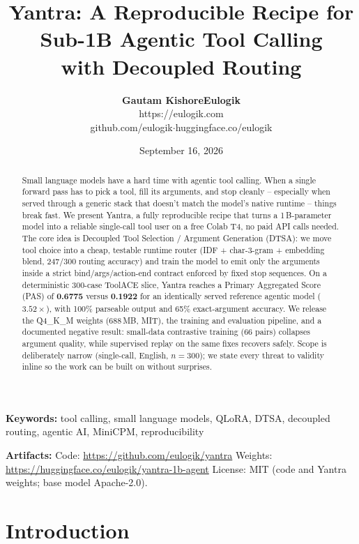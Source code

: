 \documentclass[11pt]{article}
\title{Yantra: A Reproducible Recipe for Sub-1B Agentic Tool Calling\\with Decoupled Routing}
\author{%
  {\Large\bfseries Gautam Kishore\enspace Eulogik}\\[4pt]
  {\normalsize https://eulogik.com}\\[2pt]
  {\normalsize github.com/eulogik\enspace$\cdot$\enspace huggingface.co/eulogik}
}
\date{September 16, 2026}
\begin{document}
\maketitle

\begin{abstract}
Small language models have a hard time with agentic tool calling. When a single
forward pass has to pick a tool, fill its arguments, and stop cleanly -- especially
when served through a generic stack that doesn't match the model's native runtime --
things break fast. We present Yantra, a fully reproducible recipe that turns a
1\,B-parameter model into a reliable single-call tool user on a free Colab T4,
no paid API calls needed. The core idea is Decoupled Tool Selection / Argument
Generation (DTSA): we move tool choice into a cheap, testable runtime router
(IDF + char-3-gram + embedding blend, 247/300 routing accuracy) and train the
model to emit only the arguments inside a strict bind/args/action-end contract
enforced by fixed stop sequences. On a deterministic 300-case ToolACE slice,
Yantra reaches a Primary Aggregated Score (PAS) of \textbf{0.6775} versus
\textbf{0.1922} for an identically served reference agentic model ($3.52\times$),
with 100\% parseable output and 65\% exact-argument accuracy. We release the
Q4\_K\_M weights (688\,MB, MIT), the training and evaluation pipeline, and
a documented negative result: small-data contrastive training (66 pairs) collapses
argument quality, while supervised replay on the same fixes recovers safely.
Scope is deliberately narrow (single-call, English, $n=300$); we state every
threat to validity inline so the work can be built on without surprises.
\end{abstract}

\noindent\textbf{Keywords:} tool calling, small language models, QLoRA, DTSA, decoupled routing, agentic AI, MiniCPM, reproducibility

\noindent\textbf{Artifacts:}\quad
Code: \url{https://github.com/eulogik/yantra}\quad
Weights: \url{https://huggingface.co/eulogik/yantra-1b-agent}\quad
License: MIT (code and Yantra weights; base model Apache-2.0).

\section{Introduction}
\label{sec:intro}
\end{document}

